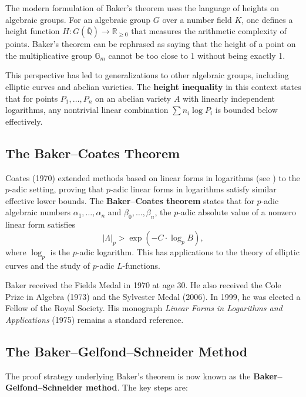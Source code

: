 The modern formulation of Baker's theorem uses the language of heights on algebraic groups. For an algebraic group $G$ over a number field $K$, one defines a height function $H: G(\overline{\mathbb{Q}}) \to \mathbb{R}_{\geq 0}$ that measures the arithmetic complexity of points. Baker's theorem can be rephrased as saying that the height of a point on the multiplicative group $\mathbb{G}_m$ cannot be too close to 1 without being exactly 1.

This perspective has led to generalizations to other algebraic groups, including elliptic curves and abelian varieties. The \textbf{height inequality} in this context states that for points $P_1, \ldots, P_n$ on an abelian variety $A$ with linearly independent logarithms, any nontrivial linear combination $\sum n_i \log P_i$ is bounded below effectively.

\subsection*{The Baker--Coates Theorem}

Coates (1970) extended methods based on linear forms in logarithms (see \cite{baker1966}) to the $p$-adic setting, proving that $p$-adic linear forms in logarithms satisfy similar effective lower bounds. The \textbf{Baker--Coates theorem} states that for $p$-adic algebraic numbers $\alpha_1, \ldots, \alpha_n$ and $\beta_0, \ldots, \beta_n$, the $p$-adic absolute value of a nonzero linear form satisfies
\[
|\Lambda|_p > \exp(-C \cdot \log_p B),
\]
where $\log_p$ is the $p$-adic logarithm. This has applications to the theory of elliptic curves and the study of $p$-adic $L$-functions.

Baker received the Fields Medal in 1970 at age 30. He also received the Cole Prize in Algebra (1973) and the Sylvester Medal (2006). In 1999, he was elected a Fellow of the Royal Society. His monograph \emph{Linear Forms in Logarithms and Applications} (1975) remains a standard reference.

\subsection*{The Baker--Gelfond--Schneider Method}

The proof strategy underlying Baker's theorem is now known as the \textbf{Baker--Gelfond--Schneider method}. The key steps are:

